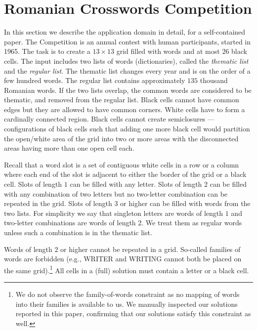 \section{Romanian Crosswords Competition}
\label{sec::roco}


In this section we describe the application domain in detail,
for a self-contained paper.
The Competition is an annual contest with human participants, started in 1965.
The task is to create a $13\times13$ grid filled with words and
at most $26$ black cells.
The input includes two lists of words (dictionaries), called the \emph{thematic list}
and the \emph{regular list}.
The thematic list changes every year and is on the order of a few hundred words.
The regular list contains approximately $135$ thousand Romanian words.
If the two lists overlap, the common words 
are considered to be thematic, and removed from the regular list.
Black cells cannot have common edges but they are allowed to have common corners. 
White cells have to form a cardinally connected region. Black cells cannot create semiclosures --- configurations of black cells such that
adding one more black cell would partition the open/white area of the grid into two or more
areas with the disconnected areas having more than one open cell each.

Recall that a {word slot}
is a set of contiguous white cells in a row or a column
where each end of the slot is adjacent to either the 
border of the grid or a black cell.
%
Slots of length $1$ can be filled with any letter.
Slots of length $2$ can be filled with any combination of two letters
but no two-letter combination can be repeated in the grid.
Slots of length $3$ or higher can be filled with words from the two lists.
For simplicity we say that singleton letters are words
of length $1$ and two-letter combinations are words of length $2$.
We treat them as regular words unless such a combination is in the thematic list.%

Words of length $2$ or higher cannot be repeated in a grid.
So-called families of words are forbidden (e.g., 
{\sf\small WRITER} and {\sf\small WRITING} cannot both be placed on the same grid).\footnote{We do not observe the family-of-words constraint as no mapping of words into their families is available to us.
We manually inspected our 
solutions reported in this paper, confirming that our solutions satisfy this constraint as well.}
All cells in a (full) solution must contain a letter or a black cell.

